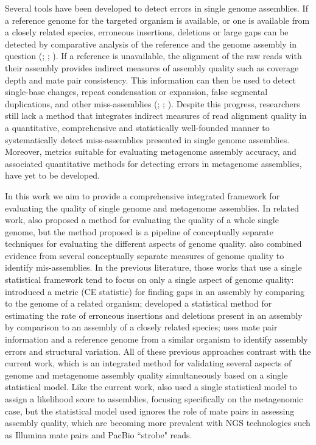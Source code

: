 \documentclass[phd,tocprelim]{cornell}
\begin{document}
Several tools have been developed to detect errors in single genome assemblies. If a reference genome for the targeted organism is available, or one is available from a closely related species, erroneous insertions, deletions or large gaps can be detected by comparative analysis of the reference and the genome assembly in question (\cite{Meader2010}; \cite{Salzberg2012}; \cite{Zimin2008}). If a reference is unavailable, the alignment of the raw reads with their assembly provides indirect measures of assembly quality such as coverage depth and mate pair consistency. This information can then be used to detect single-base changes, repeat condensation or expansion, false segmental duplications, and other miss-assemblies (\cite{Choi2008}; \cite{Phillippy2008}; \cite{Narzisi2011}). Despite this progress, researchers still lack a method that integrates indirect measures of read alignment quality in a quantitative, comprehensive and statistically well-founded manner to systematically detect miss-assemblies presented in single genome assemblies. Moreover, metrics suitable for evaluating metagenome assembly accuracy, and associated quantitative methods for detecting errors in metagenome assemblies, have yet to be developed.

In this work we aim to provide a comprehensive integrated framework for evaluating the quality of single genome and metagenome assemblies.  In related work, \cite{Phillippy2008} also proposed a method for evaluating the quality of a whole single genome, but the method proposed is a pipeline of conceptually separate techniques for evaluating the different aspects of genome quality.  \cite{Choi2008} also combined evidence from several conceptually separate measures of genome quality to identify mis-assemblies.  In the previous literature, those works that use a single statistical framework tend to focus on only a single aspect of genome quality: \cite{Zimin2008} introduced a metric (CE statistic) for finding gaps in an assembly by comparing to the genome of a related organism; \cite{Meader2010} developed a statistical method for estimating the rate of erroneous insertions and deletions present in an assembly by comparison to an assembly of a closely related species; \cite{Olson2009} uses mate pair information and a reference genome from a similar organism to identify assembly errors and structural variation.  All of these previous approaches contrast with the current work, which is an integrated method for validating several aspects of genome and metagenome assembly quality simultaneously based on a single statistical model.  Like the current work, \cite{Laserson2011} also used a single statistical model to assign a likelihood score to assemblies, focusing specifically on the metagenomic case, but the statistical model used ignores the role of mate pairs in assessing assembly quality, which are becoming more prevalent with NGS technologies such as Illumina mate pairs and PacBio ``strobe" reads.
\end{document}
